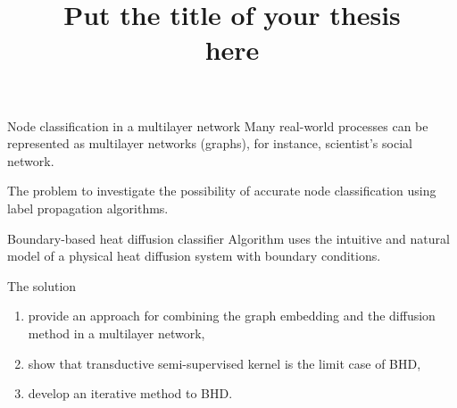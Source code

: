 \documentclass[12pt,pdf,hyperref={unicode}]{beamer}
\title{ Put the title of your thesis \\ here}
\begin{document}
\setcounter{page}{2}%
\begin{frame}{Node classification in a multilayer network}
Many real-world processes can be represented as multilayer networks (graphs), for instance, scientist’s social network.
\begin{block}{The problem}
to investigate the possibility of accurate node classification using label propagation algorithms.
\end{block}
\begin{block}{Boundary-based heat diffusion classifier}
Algorithm uses the intuitive and natural model of a physical heat diffusion system with boundary conditions.
\end{block}
\begin{block}{The solution}
\begin{enumerate}[1)]
\item provide an approach for combining the graph embedding and the diffusion method in a multilayer network,
\item show that transductive semi-supervised kernel is the limit case of BHD,
\item develop an iterative method to BHD.
\end{enumerate}
\end{block}
\end{frame}
\end{document}
